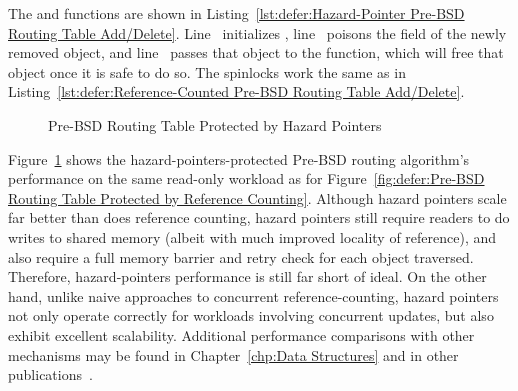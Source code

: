 \begin{fcvref}
The  and  functions are shown in
Listing~\ref{lst:defer:Hazard-Pointer Pre-BSD Routing Table Add/Delete}.
Line~ initializes ,
line~ poisons the  field of the newly removed
object, and
line~ passes that object to the
 function, which will free that object once it
is safe to do so.
The spinlocks work the same as in
Listing~\ref{lst:defer:Reference-Counted Pre-BSD Routing Table Add/Delete}.
\end{fcvref}

\begin{figure}
\centering
{}
\caption{Pre-BSD Routing Table Protected by Hazard Pointers}
\label{fig:defer:Pre-BSD Routing Table Protected by Hazard Pointers}
\end{figure}

Figure~\ref{fig:defer:Pre-BSD Routing Table Protected by Hazard Pointers}
shows the hazard-pointers-protected Pre-BSD routing algorithm's
performance on the same read-only workload as for
Figure~\ref{fig:defer:Pre-BSD Routing Table Protected by Reference Counting}.
Although hazard pointers scale far better than does reference counting,
hazard pointers still require readers to do writes to shared
memory (albeit with much improved locality of reference),
and also require a full memory barrier and retry check for each
object traversed.
Therefore, hazard-pointers performance is still far short of ideal.
On the other hand, unlike naive approaches to concurrent
reference-counting, hazard pointers not only operate correctly for
workloads involving concurrent updates, but also exhibit excellent
scalability.
Additional performance comparisons with other mechanisms may be found in
Chapter~\ref{chp:Data Structures}
and in other publications~\cite{ThomasEHart2007a,McKenney:2013:SDS:2483852.2483867,MagedMichael04a}.

